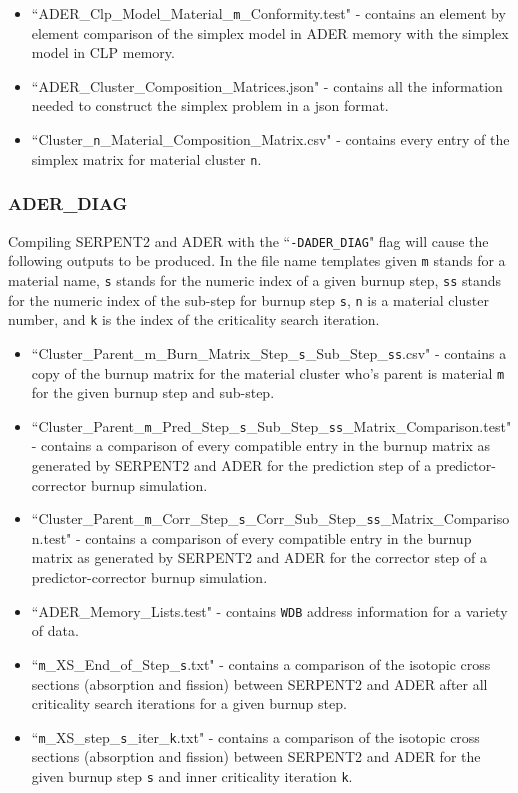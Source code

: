 \begin{itemize}
\item{``ADER\_Clp\_Model\_Material\_\texttt{m}\_Conformity.test" - contains an
element by element comparison of the simplex model in ADER memory with the
simplex model in CLP memory.}
\item{``ADER\_Cluster\_Composition\_Matrices.json" - contains all the
information needed to construct the simplex problem in a json format.} 
\item{``Cluster\_\texttt{n}\_Material\_Composition\_Matrix.csv" - contains every
entry of the simplex matrix for material cluster \texttt{n}.}
\end{itemize}

\subsubsection{ADER\_DIAG}\label{sssec:output_dev_diag}
Compiling SERPENT2 and ADER with the ``\texttt{-DADER\_DIAG}" flag will
cause the following outputs to be produced. In the file name templates given
\texttt{m} stands for a material name, \texttt{s} stands for the numeric index
of a given burnup step, \texttt{ss} stands for the numeric index of the sub-step
for burnup step \texttt{s}, \texttt{n} is a material cluster number, and 
\texttt{k} is the index of the criticality search iteration.

\begin{itemize}
\item{``Cluster\_Parent\_m\_Burn\_Matrix\_Step\_\texttt{s}\_Sub\_Step\_\texttt{ss}.csv" - contains a copy of the burnup matrix for the material cluster who's
parent is material \texttt{m} for the given burnup step and sub-step.}
\item{``Cluster\_Parent\_\texttt{m}\_Pred\_Step\_\texttt{s}\_Sub\_Step\_\texttt{ss}\_Matrix\_Comparison.test" - contains a comparison of every compatible entry in
the burnup matrix as generated by SERPENT2 and ADER for the prediction step
of a predictor-corrector burnup simulation.}
\item{``Cluster\_Parent\_\texttt{m}\_Corr\_Step\_\texttt{s}\_Corr\_Sub\_Step\_\texttt{ss}\_Matrix\_Comparison.test" - contains a comparison of every compatible 
entry in
the burnup matrix as generated by SERPENT2 and ADER for the corrector step
of a predictor-corrector burnup simulation.}
\item{``ADER\_Memory\_Lists.test" - contains \texttt{WDB} address information 
for a variety of data.}
\item{``\texttt{m}\_XS\_End\_of\_Step\_\texttt{s}.txt" - contains a comparison 
of the isotopic cross sections (absorption and fission) between SERPENT2 and 
ADER after all criticality search iterations for a given burnup step.}
\item{``\texttt{m}\_XS\_step\_\texttt{s}\_iter\_\texttt{k}.txt" - contains a
comparison of the isotopic cross sections (absorption and fission) between
SERPENT2 and ADER for the given burnup step \texttt{s} and inner criticality
iteration \texttt{k}.}
\end{itemize}

